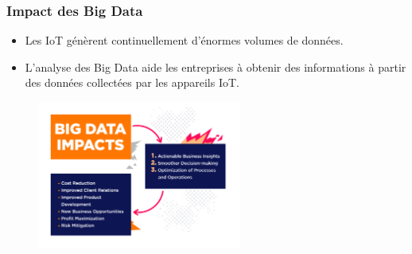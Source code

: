 \documentclass{beamer}
\begin{document}
\begin{frame}
	\frametitle{Impact des Big Data}
	
	\begin{itemize}
		\item Les IoT génèrent continuellement d'énormes volumes de données.
\item L'analyse des Big Data aide les entreprises à obtenir des informations à partir des données collectées par les appareils IoT.
	\end{itemize}
	
	\begin{figure}
		\centering
		\includegraphics[width=0.6\textwidth]{big_data_benefits.jpg}
	\end{figure}
	
\end{frame}
\end{document}
